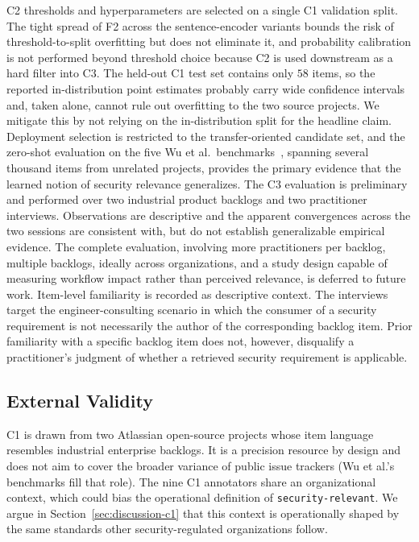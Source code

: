 C2 thresholds and hyperparameters are selected on a single C1 validation split.
The tight spread of F2 across the sentence-encoder variants bounds the risk of threshold-to-split overfitting but does not eliminate it, and probability calibration is not performed beyond threshold choice because C2 is used downstream as a hard filter into C3.
The held-out C1 test set contains only $58$ items, so the reported in-distribution point estimates probably carry wide confidence intervals and, taken alone, cannot rule out overfitting to the two source projects.
We mitigate this by not relying on the in-distribution split for the headline claim. Deployment selection is restricted to the transfer-oriented candidate set, and the zero-shot evaluation on the five Wu et al.\ benchmarks~\cite{wu2022data-quality}, spanning several thousand items from unrelated projects, provides the primary evidence that the learned notion of security relevance generalizes.
The C3 evaluation is preliminary and performed over two industrial product backlogs and two practitioner interviews.
Observations are descriptive and the apparent convergences across the two sessions are consistent with, but do not establish generalizable empirical evidence.
The complete evaluation, involving more practitioners per backlog, multiple backlogs, ideally across organizations, and a study design capable of measuring workflow impact rather than perceived relevance, is deferred to future work.
Item-level familiarity is recorded as descriptive context.
The interviews target the engineer-consulting scenario in which the consumer of a security requirement is not necessarily the author of the corresponding backlog item.
Prior familiarity with a specific backlog item does not, however, disqualify a practitioner's judgment of whether a retrieved security requirement is applicable.

\subsection{External Validity}

C1 is drawn from two Atlassian open-source projects whose item language resembles industrial enterprise backlogs. It is a precision resource by design and does not aim to cover the broader variance of public issue trackers (Wu et al.'s benchmarks fill that role).
The nine C1 annotators share an organizational context, which could bias the operational definition of \texttt{security-relevant}.
We argue in Section~\ref{sec:discussion-c1} that this context is operationally shaped by the same standards other security-regulated organizations follow.

